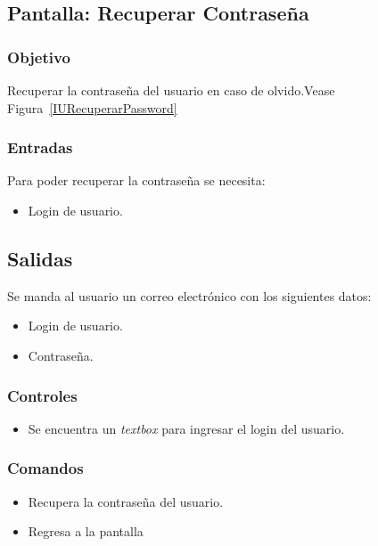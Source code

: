 \subsection{Pantalla: Recuperar Contraseña}
\subsubsection{Objetivo}
Recuperar la contraseña del usuario en caso de olvido.Vease Figura~\ref{IURecuperarPassword}


\subsubsection{Entradas}
Para poder recuperar la contraseña se necesita: 
\begin{itemize}
\item Login de usuario.
\end{itemize}

\subsection{Salidas}
Se manda al usuario un correo electrónico con los siguientes datos:
\begin{itemize}
 \item Login de usuario.
 \item Contraseña.
\end{itemize}


\subsubsection{Controles}
\begin{itemize}
 \item Se encuentra un \textit{textbox} para ingresar el login del usuario.
\end{itemize}

\subsubsection{Comandos}
\begin{itemize}
 \item {} Recupera la contraseña del usuario.
 \item {} Regresa a la pantalla
\end{itemize}
